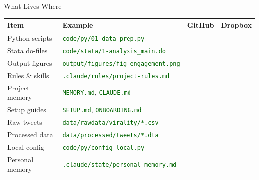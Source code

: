 \documentclass[aspectratio=169,11pt,dvipsnames]{beamer}
\newcommand{\file}[1]{\textcolor{darkgreen}{\nolinkurl{#1}}}
\newcommand{\yes}{\textcolor{darkgreen}{\faCheckCircle}}
\newcommand{\no}{\textcolor{alertclr}{\faTimesCircle}}
\begin{document}
\begin{frame}{What Lives Where}
  \begin{center}
  \small
  \begin{tabularx}{0.95\textwidth}{lXcc}
    \toprule
    \textbf{Item} & \textbf{Example} & \textbf{GitHub} & \textbf{Dropbox} \\
    \midrule
    Python scripts     & \file{code/py/01_data_prep.py}          & \yes & \no \\
    Stata do-files     & \file{code/stata/1-analysis_main.do}    & \yes & \no \\
    Output figures     & \file{output/figures/fig_engagement.png}& \yes & \no \\
    Rules \& skills    & \file{.claude/rules/project-rules.md}   & \yes & \no \\
    Project memory     & \file{MEMORY.md}, \file{CLAUDE.md}      & \yes & \no \\
    Setup guides       & \file{SETUP.md}, \file{ONBOARDING.md}   & \yes & \no \\
    \midrule
    Raw tweets         & \file{data/rawdata/virality/*.csv}      & \no  & \yes \\
    Processed data     & \file{data/processed/tweets/*.dta}      & \no  & \yes \\
    \midrule
    Local config       & \file{code/py/config_local.py}          & \no  & \no \\      
    Personal memory    & \file{.claude/state/personal-memory.md} & \no  & \no \\
    \bottomrule
  \end{tabularx}
  \end{center}
\end{frame}
\end{document}
